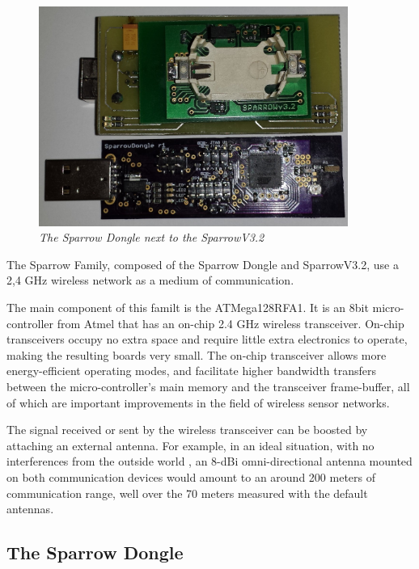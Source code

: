 \begin{figure}[ht]
\begin{center}
\includegraphics[width=0.9\textwidth]{hw_platform/sparrow.jpg}
\end{center}
\caption{\small \itshape{The Sparrow Dongle next to the SparrowV3.2}}
\end{figure}
 
The Sparrow Family, composed of the Sparrow Dongle and SparrowV3.2, use a 2,4 GHz wireless network as a medium of communication. 

The main component of this familt is the ATMega128RFA1. It is an 8bit micro-controller from Atmel that has an on-chip 2.4 GHz wireless transceiver. On-chip transceivers occupy no extra space and require little extra electronics to operate, making the resulting boards very small. The on-chip transceiver allows more energy-efficient operating modes, and facilitate higher bandwidth transfers between the micro-controller's main memory and the transceiver frame-buffer, all
of which are important improvements in the field of wireless sensor networks. 

The signal received or sent by the wireless transceiver can be boosted by attaching an external antenna. For example, in an ideal situation, with no interferences from the outside world , an 8-dBi omni-directional antenna mounted on both communication devices would amount to an around 200 meters of communication range, well over the 70 meters measured with the default antennas.

\subsection{The Sparrow Dongle}

